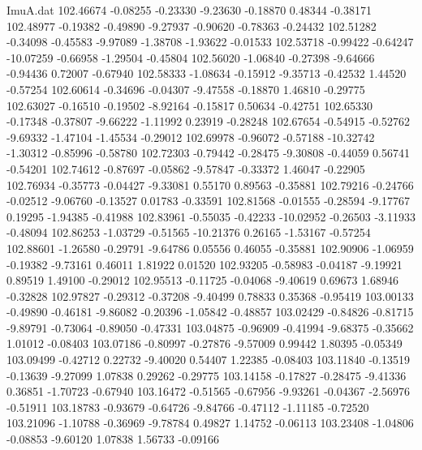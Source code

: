 \begin{filecontents}{ImuA.dat}
 102.46674   -0.08255   -0.23330   -9.23630   -0.18870    0.48344   -0.38171
 102.48977   -0.19382   -0.49890   -9.27937   -0.90620   -0.78363   -0.24432
 102.51282   -0.34098   -0.45583   -9.97089   -1.38708   -1.93622   -0.01533
 102.53718   -0.99422   -0.64247  -10.07259   -0.66958   -1.29504   -0.45804
 102.56020   -1.06840   -0.27398   -9.64666   -0.94436    0.72007   -0.67940
 102.58333   -1.08634   -0.15912   -9.35713   -0.42532    1.44520   -0.57254
 102.60614   -0.34696   -0.04307   -9.47558   -0.18870    1.46810   -0.29775
 102.63027   -0.16510   -0.19502   -8.92164   -0.15817    0.50634   -0.42751
 102.65330   -0.17348   -0.37807   -9.66222   -1.11992    0.23919   -0.28248
 102.67654   -0.54915   -0.52762   -9.69332   -1.47104   -1.45534   -0.29012
 102.69978   -0.96072   -0.57188  -10.32742   -1.30312   -0.85996   -0.58780
 102.72303   -0.79442   -0.28475   -9.30808   -0.44059    0.56741   -0.54201
 102.74612   -0.87697   -0.05862   -9.57847   -0.33372    1.46047   -0.22905
 102.76934   -0.35773   -0.04427   -9.33081    0.55170    0.89563   -0.35881
 102.79216   -0.24766   -0.02512   -9.06760   -0.13527    0.01783   -0.33591
 102.81568   -0.01555   -0.28594   -9.17767    0.19295   -1.94385   -0.41988
 102.83961   -0.55035   -0.42233  -10.02952   -0.26503   -3.11933   -0.48094
 102.86253   -1.03729   -0.51565  -10.21376    0.26165   -1.53167   -0.57254
 102.88601   -1.26580   -0.29791   -9.64786    0.05556    0.46055   -0.35881
 102.90906   -1.06959   -0.19382   -9.73161    0.46011    1.81922    0.01520
 102.93205   -0.58983   -0.04187   -9.19921    0.89519    1.49100   -0.29012
 102.95513   -0.11725   -0.04068   -9.40619    0.69673    1.68946   -0.32828
 102.97827   -0.29312   -0.37208   -9.40499    0.78833    0.35368   -0.95419
 103.00133   -0.49890   -0.46181   -9.86082   -0.20396   -1.05842   -0.48857
 103.02429   -0.84826   -0.81715   -9.89791   -0.73064   -0.89050   -0.47331
 103.04875   -0.96909   -0.41994   -9.68375   -0.35662    1.01012   -0.08403
 103.07186   -0.80997   -0.27876   -9.57009    0.99442    1.80395   -0.05349
 103.09499   -0.42712    0.22732   -9.40020    0.54407    1.22385   -0.08403
 103.11840   -0.13519   -0.13639   -9.27099    1.07838    0.29262   -0.29775
 103.14158   -0.17827   -0.28475   -9.41336    0.36851   -1.70723   -0.67940
 103.16472   -0.51565   -0.67956   -9.93261   -0.04367   -2.56976   -0.51911
 103.18783   -0.93679   -0.64726   -9.84766   -0.47112   -1.11185   -0.72520
 103.21096   -1.10788   -0.36969   -9.78784    0.49827    1.14752   -0.06113
 103.23408   -1.04806   -0.08853   -9.60120    1.07838    1.56733   -0.09166

\end{filecontents}
